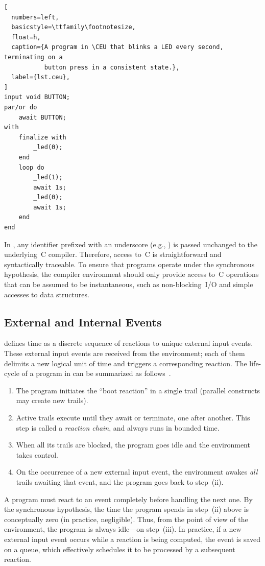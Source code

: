 \begin{lstlisting}[
  numbers=left,
  basicstyle=\ttfamily\footnotesize,
  float=h,
  caption={A program in \CEU that blinks a LED every second, terminating on a
           button press in a consistent state.},
  label={lst.ceu},
]
input void BUTTON;
par/or do
    await BUTTON;
with
    finalize with
        _led(0);
    end
    loop do
        _led(1);
        await 1s;
        _led(0);
        await 1s;
    end
end
\end{lstlisting}

In \CEU, any identifier prefixed with an underscore (e.g., ) is
passed unchanged to the underlying~C compiler.
%
Therefore, access to~C is straightforward and syntactically traceable.
%
To ensure that programs operate under the synchronous hypothesis, the compiler
environment should only provide access to~C operations that can be assumed to
be instantaneous, such as non-blocking~I/O and simple accesses to data
structures.

\subsection{External and Internal Events}
\label{sec.ceu.evts}

\CEU defines time as a discrete sequence of reactions to unique external
input events.
%
These external input events are received from the environment; each of them
delimits a new logical unit of time and triggers a corresponding reaction.
%
The life-cycle of a program in \CEU can be summarized as
follows~\cite{ceu.sensys13}.
%
\begin{enumerate}
\item The program initiates the ``boot reaction'' in a single trail
  (parallel constructs may create new trails).
\item Active trails execute until they await or terminate, one after
  another.  This step is called a \emph{reaction chain}, and always runs in
  bounded time.
\item When all its trails are blocked, the program goes idle and the
  environment takes control.
\item On the occurrence of a new external input event, the environment
  awakes \emph{all} trails awaiting that event, and the program goes back to
  step~(ii).
\end{enumerate}

A program must react to an event completely before handling the next one.
%
By the synchronous hypothesis, the time the program spends in step~(ii)
above is conceptually zero (in practice, negligible).
%
Thus, from the point of view of the environment, the program is always
idle---on step~(iii).
%
In practice, if a new external input event occurs while a reaction is being
computed, the event is saved on a queue, which effectively schedules it to
be processed by a subsequent reaction.

